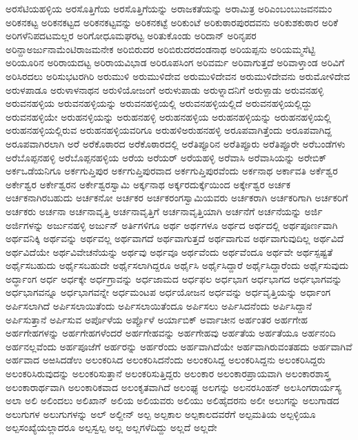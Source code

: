 {ಅರಸೆಟಿಯಹಳ್ಳಿಯ
ಅರಸೊತ್ತಿಗೆಯ
ಅರಸೊತ್ತಿಗೆಯನ್ನು
ಅರಾಜಕತೆಯನ್ನು
ಅರಾಮಿತ್ರ
ಅರಿಎಂಬಂಬುಜವನಮಂ
ಅರಿಕನಕಟ್ಟ
ಅರಿಕನಕಟ್ಟದ
ಅರಿಕನಕಟ್ಟವನ್ನು
ಅರಿಕನಕಟ್ಟೆ
ಅರಿಕುಂಟೆ
ಅರಿಕುಠಾರಪುರದವನು
ಅರಿಕುಶಕುಠಾರ
ಅರಿಕೆ
ಅರಿಗಳೆನಿಪದಟಮಲ್ಲರ
ಅರಿಗೋಧೂಮಘರಟ್ಟ
ಅರಿತುಕೊಂಡು
ಅರಿದಾನ್
ಅರಿನೃಪರ
ಅರಿನ್ದಾಅರ್ಜುನಾಮೆಂಟಿರಾಜಮನೇಕ
ಅರಿಬಿರುದರ
ಅರಿಬಿರುದರದಂಡನಾಥ
ಅರಿಯಪ್ಪನು
ಅರಿಯಮ್ಮಸೆಟ್ಟಿ
ಅರಿಯೂರಿನ
ಅರಿರಾಯದಟ್ಟ
ಅರಿರಾಯವಿಭಾಡ
ಅರಿರೂಪಸಿಂಗ
ಅರಿವರ್ಮ
ಅರಿವಾಗುತ್ತದೆ
ಅರಿವಾಳ್ತಾಂಡ
ಅರಿವಿಗೆ
ಅರಿಸಿರದಲು
ಅರಿಸುಭಟರಗಿರಿ
ಅರುಮುಳಿ
ಅರುಮುಳಿದೇವ
ಅರುಮುಳಿದೇವನ
ಅರುಮುಳಿದೇವನು
ಅರುಮೋಳಿದೇವ
ಅರುಳಪಾಡೂ
ಅರುಳಾಳನಾಥನ
ಅರುಳಿಯೋಜಂಗೆ
ಅರುಳುಪಾಡು
ಅರುಳ್ನಾದನಿಗೆ
ಅರುಳ್ಪಾಡು
ಅರುವನಹಳ್ಳಿ
ಅರುವನಹಳ್ಳಿಯ
ಅರುವನಹಳ್ಳಿಯನ್ನು
ಅರುವನಹಳ್ಳಿಯಲ್ಲಿ
ಅರುವನಹಳ್ಳಿಯಲ್ಲಿದೆ
ಅರುವನಹಳ್ಳಿಯಲ್ಲಿದ್ದು
ಅರುವನಹಳ್ಳಿಯೇ
ಅರುಹನಳ್ಳಿಯನ್ನು
ಅರುಹನಹಳ್ಳಿ
ಅರುಹನಹಳ್ಳಿಯ
ಅರುಹನಹಳ್ಳಿಯನ್ನು
ಅರುಹನಹಳ್ಳಿಯಲ್ಲಿ
ಅರುಹನಹಳ್ಳಿಯಲ್ಲಿರುವ
ಅರುಹನಹಳ್ಳಿಯವರಿಗೂ
ಅರುಹಳಿಅರುಹನಹಳ್ಳಿ
ಅರೂಪವಾಗಿತ್ತೆಂದು
ಅರೂಪವಾಗಿದ್ದ
ಅರೂಪವಾಗಿರಲಾಗಿ
ಅರೆ
ಅರೆಕೊಠಾರದ
ಅರೆಕೊಠಾರದಲ್ಲಿ
ಅರೆತಿಪ್ಪೂರಿನ
ಅರೆತಿಪ್ಪೂರು
ಅರೆತಿಪ್ಪೂರೇ
ಅರೆಬಂಡೆಗಳು
ಅರೆಬೊಪ್ಪನಹಳ್ಳಿ
ಅರೆಬೊಪ್ಪನಹಳ್ಳಿಯ
ಅರೆಯ
ಅರೆಯರ್
ಅರೆಯಹಳ್ಳಿ
ಅರೆವಾಸಿ
ಅರೆವಾಸಿಯನ್ನು
ಅರೇಬಿಕ್
ಅರ್ಕಒಡೆಯನಿಗೂ
ಅರ್ಕಗುಪ್ತಿಪುರ
ಅರ್ಕಗುಪ್ತಿಪುರವಾದ
ಅರ್ಕಗುಪ್ತಿಪುರವೆಂದು
ಅರ್ಕನಾಥ
ಅರ್ಕಾವತಿ
ಅರ್ಕೆಶ್ವರ
ಅರ್ಕೇಶ್ವರ
ಅರ್ಕೇಶ್ವರನ
ಅರ್ಕೇಶ್ವರಸ್ವಾಮಿ
ಅರ್ಕ್ಕನಾಥ
ಅರ್ಕ್ಕರದುರ್ಕ್ಕೆಯಿಂದ
ಅರ್ಕ್ಕೇಶ್ವರ
ಅರ್ಚಕ
ಅರ್ಚಕನಾಗಿರಬಹುದು
ಅರ್ಚಕನೋ
ಅರ್ಚಕರ
ಅರ್ಚಕರಂಗಸ್ವಾಮಿಯವರು
ಅರ್ಚಕರಾಗಿ
ಅರ್ಚಕರಿಗಾಗಿ
ಅರ್ಚಕರಿಗೆ
ಅರ್ಚಕರು
ಅರ್ಚನಾ
ಅರ್ಚನಾವೃತ್ತಿ
ಅರ್ಚನಾವೃತ್ತಿಗೆ
ಅರ್ಚನಾವೃತ್ತಿಯಾಗಿ
ಅರ್ಚನೆಗೆ
ಅರ್ಚನೆಯನ್ನು
ಅರ್ಜಿ
ಅರ್ಜಿಗಳನ್ನು
ಅರ್ಜುನಹಳ್ಳಿ
ಅರ್ಜುನ್
ಅರ್ತಿಗಳಿಗೂ
ಅರ್ಥ
ಅರ್ಥಗಳೂ
ಅರ್ಥದ
ಅರ್ಥದಲ್ಲಿ
ಅರ್ಥಪೂರ್ಣವಾಗಿ
ಅರ್ಥವನಿಕ್ಕಿ
ಅರ್ಥವನ್ನು
ಅರ್ಥವಲ್ಲ
ಅರ್ಥವಾಗದೆ
ಅರ್ಥವಾಗುತ್ತದೆ
ಅರ್ಥವಾಗುವ
ಅರ್ಥವಾಗುವುದಿಲ್ಲ
ಅರ್ಥವಿದೆ
ಅರ್ಥವಿದೆಯೇ
ಅರ್ಥವಿವೇಚನೆಯನ್ನು
ಅರ್ಥವು
ಅರ್ಥವೂ
ಅರ್ಥವೆಂದು
ಅರ್ಥವೆಂದೂ
ಅರ್ಥವೇ
ಅರ್ಥಸ್ಪಷ್ಟತೆ
ಅರ್ಥೈಸಬಹುದು
ಅರ್ಥೈಸಬಹುದೇ
ಅರ್ಥೈಸಲಾಗಿದ್ದರೂ
ಅರ್ಥೈಸಿ
ಅರ್ಥೈಸಿದ್ದಾರೆ
ಅರ್ಥೈಸಿದ್ದಾರೆಂದು
ಅರ್ಥೈಸುವುದು
ಅರ್ದ್ಧಾಂಗ
ಅರ್ಧ
ಅರ್ಧಕ್ಕೇ
ಅರ್ಧಗ್ರಾವನ್ನು
ಅರ್ಧಜಾಮದ
ಅರ್ಧಫಲ
ಅರ್ಧಭಾಗ
ಅರ್ಧಭಾಗದ
ಅರ್ಧಭಾಗವನ್ನು
ಅರ್ಧಭಾಗವನ್ನೂ
ಅರ್ಧಭಾಗವನ್ನೇ
ಅರ್ಧಮಂಟಪ
ಅರ್ಧಯೋಜನ
ಅರ್ಧವನ್ನು
ಅರ್ಧವೃತ್ತಿಯನ್ನು
ಅರ್ಧಾಂಗ
ಅರ್ಪಿಸಲಾಗಿದೆ
ಅರ್ಪಿಸಲಾಯಿತೆಂದು
ಅರ್ಪಿಸಲಾಯಿತೆಂದೂ
ಅರ್ಪಿಸಲು
ಅರ್ಪಿಸಿದನೆಂದು
ಅರ್ಪಿಸಿದ್ದಾನೆ
ಅರ್ಪಿಸುತ್ತಾನೆ
ಅರ್ಪಿಸುವ
ಅರ್ಪೊಳೆಯ
ಅರ್ಪ್ಪೊಳೆ
ಅರ್ಯಾಬಿಕ್
ಅರ್ವಾಚೀನ
ಅರ್ಹಂತರ
ಅರ್ಹಗೇಹ
ಅರ್ಹಗೇಹಗಳನ್ನು
ಅರ್ಹಗೇಹಗಳೆಂದರೆ
ಅರ್ಹಗೇಹವನ್ನು
ಅರ್ಹಗೇಹವು
ಅರ್ಹತೆಯ
ಅರ್ಹತೆಯೂ
ಅರ್ಹನಂದಿ
ಅರ್ಹನಲ್ಲವೆಂದು
ಅರ್ಹಪೂಜೆಗೆ
ಅರ್ಹರನ್ನು
ಅರ್ಹರೆಂದು
ಅರ್ಹವಾಗಿದೆಯೇ
ಅರ್ಹವಾಗಿರುವಂತಹದು
ಅರ್ಹವಾಗಿವೆ
ಅರ್ಹವಾದ
ಅಱಸಿದಡೆಉ
ಅಲಂಕರಿಸಿದ
ಅಲಂಕರಿಸಿದನೆಂದು
ಅಲಂಕರಿಸಿದ್ದ
ಅಲಂಕರಿಸಿದ್ದನು
ಅಲಂಕರಿಸಿದ್ದರು
ಅಲಂಕರಿಸಿರುವುದನ್ನು
ಅಲಂಕರಿಸುತ್ತಾನೆ
ಅಲಂಕರಿಸುತ್ತಿದ್ದರು
ಅಲಂಕಾರ
ಅಲಂಕಾರಪ್ರಾಯವಾಗಿ
ಅಲಂಕಾರಶಾಸ್ತ್ರ
ಅಲಂಕಾರಾರ್ಥವಾಗಿ
ಅಲಂಕಾರಿಕವಾದ
ಅಲಂಕೃತವಾಗಿದೆ
ಅಲಂಘ್ಯ
ಅಲಗನ್ನು
ಅಲನರಸಿಂಹನ್
ಅಲಸಿಂಗರಾರ್ಯಸ್ಯ
ಅಲಾ
ಅಲಿ
ಅಲಿಂದಲು
ಅಲಿಖಾನ್
ಅಲಿಯ
ಅಲಿಯವರು
ಅಲಿಯು
ಅಲಿಹೈದರನು
ಅಲೀ
ಅಲುಗನ್ನು
ಅಲುಗಾಡದ
ಅಲುಗುಗಳ
ಅಲುಗುಗಳನ್ನು
ಅಲ್
ಅಲ್ದೀನ್
ಅಲ್ಪ
ಅಲ್ಪಕಾಲ
ಅಲ್ಪಕಾಲದವರೆಗೆ
ಅಲ್ಪಮತಿಯ
ಅಲ್ಪಳ್ಳಿಯೂ
ಅಲ್ಪಸಂಖ್ಯೆಯಲ್ಲಾದರೂ
ಅಲ್ಪಸ್ವಲ್ಪ
ಅಲ್ಲ
ಅಲ್ಲಗಳೆದಿದ್ದು
ಅಲ್ಲದೆ
ಅಲ್ಲದೇ
}
